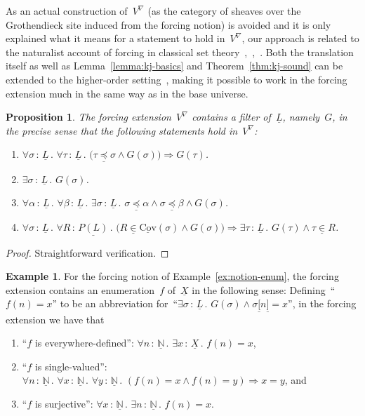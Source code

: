\documentclass[com,11pt,crcready]{iosart2x}
\theoremstyle{definition}
\newtheorem{example}[definition]{Example}
\theoremstyle{plain}
\newtheorem{proposition}[definition]{Proposition}
\theoremstyle{remark}
\newcommand{\?}{\,{:}\,}
\newcommand{\NN}{\mathbb{N}}
\newcommand{\Cov}{\mathrm{Cov}}
\renewcommand{\_}{\mathpunct{.}\,}
\begin{document}
As an actual construction of~$V^\nabla$ (as the category of sheaves over the
Grothendieck site induced from the forcing notion) is avoided and it is only
explained what it means for a statement to hold in~$V^\nabla$, our approach is
related to the naturalist account of forcing in classical set
theory~\cite[Theorem~2]{hamkins:multiverse},~\cite[Section~4]{maddy-meadows:reconstruction},~\cite{barton:forcing}.
Both the translation itself as well as Lemma~\ref{lemma:kj-basics} and
Theorem~\ref{thm:kj-sound} can be extended to the higher-order
setting~\cite{xxx}, making it possible to work in the forcing extension much in
the same way as in the base universe.

\begin{proposition}The forcing extension~$V^\nabla$ contains a filter
of~$\underline{L}$, namely~$G$, in the precise sense that the following
statements hold in~$V^\nabla$:
\begin{enumerate}
\item[(1)] $\forall \sigma \? \underline{L}\_ \forall \tau \? \underline{L}\_
\bigl(\tau \mathrel{\underline{\preceq}} \sigma \wedge G(\sigma)\bigr)
\Rightarrow G(\tau)$.
\item[(2a)] $\exists \sigma \? \underline{L}\_ G(\sigma)$.
\item[(2b)] $\forall \alpha \? \underline{L}\_
\forall \beta \? \underline{L}\_
\exists \sigma \? \underline{L}\_
\sigma \mathrel{\underline{\preceq}} \alpha \wedge
\sigma \mathrel{\underline{\preceq}} \beta \wedge
G(\sigma)$.
\item[(3)] $\forall \sigma \? \underline{L}\_
\forall R \? \underline{P(L)}\_
\bigl(R \mathrel{\underline{\in}} \underline{\Cov}(\sigma) \wedge
G(\sigma)\bigr) \Rightarrow
\exists \tau \? \underline{L}\_
G(\tau) \wedge \tau \mathrel{\underline{\in}} R$.
\end{enumerate}
\end{proposition}

\begin{proof}Straightforward verification.
\end{proof}

\begin{example}For the forcing notion of Example~\ref{ex:notion-enum}, the
forcing extension contains an enumeration~$f$ of~$\underline{X}$ in the following
sense: Defining~``$f(n) = x$'' to be an abbreviation for~``$\exists
\sigma\?\underline{L}\_ G(\sigma) \wedge \sigma\underline{[}n\underline{]} =
x$'', in the forcing extension we have that
\begin{enumerate}
\item ``$f$ is everywhere-defined'': $\forall n\?\underline{\NN}\_ \exists
x\?\underline{X}\_ f(n) = x$,
\item ``$f$ is single-valued'': $\forall n\?\underline{\NN}\_ \forall
x\?\underline{\NN}\_ \forall y\?\underline{\NN}\_
(f(n) = x \wedge f(n) = y) \Rightarrow x = y$, and
\item ``$f$ is surjective'': $\forall x\?\underline{\NN}\_ \exists n\?\underline{\NN}\_
f(n) = x$.
\end{enumerate}
\end{example}
\end{document}
